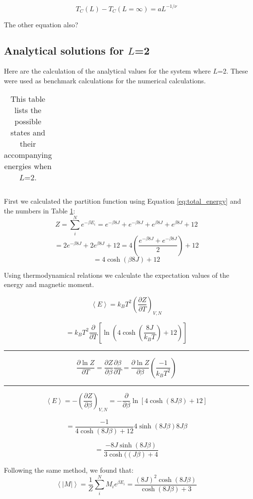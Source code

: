 \begin{equation}\label{eq:critical_T}
T_C(L) - T_C(L=\infty) = a L^{-1/\nu}
\end{equation}

The other equation also?

\subsection{Analytical solutions for $L$=2}\label{sec:analytical_sol}

Here are the calculation of the analytical values for the system where $L$=2. These were used as benchmark calculations for the numerical calculations.

\begin{table}[H]
	\caption{This table lists the possible states and their accompanying energies when $L$=2.}
	\label{tab:macro_energies}
\begin{tabular}{cccccc}
	
\end{tabular}
\end{table}

First we calculated the partition function using Equation \ref{eq:total_energy} and the numbers in Table \ref{tab:macro_energies}:
\[
Z = \sum_i^N e^{-\beta E_i} = e^{-\beta 8 J} + e^{-\beta 8 J} + e^{\beta 8 J}+e^{\beta 8 J} + 12
\]
\[
= 2e^{-\beta 8 J}+ 2e^{\beta 8 J} + 12 = 4\left(\frac{e^{-\beta 8 J}+ e^{-\beta 8 J}}{2}\right)+12
\]
\[
= 4 \cosh\left( \beta 8 J \right) + 12
\]

Using thermodynamical relations we calculate the expectation values of the energy and magnetic moment\cite{Thermal}.

\[
\left< E \right> = k_B T^2 \left(\frac{\partial Z}{\partial T}
\right)_{V,N}
\]

\[
= k_B T^2 \frac{\partial}{\partial T} \left[\ln \left(4\cosh \left(\frac{8J}{k_BT}\right) +12\right) \right]\]
\hrule
\[
\frac{\partial \ln Z}{\partial T} = \frac{\partial Z}{\partial \beta}\frac{\partial \beta}{\partial T} = \frac{\partial \ln Z}{\partial \beta}\left(\frac{-1}{k_B T^2}\right)
\]
\hrule
\[
\left< E\right> = -\left(\frac{\partial Z}{\partial \beta} \right)_{V,N} = - \frac{\partial}{\partial \beta} \ln \left[ 4 \cosh \left( 8J\beta\right)+12\right]
\]

\[
= \frac{-1}{4\cosh (8J\beta) + 12}4 \sinh(8J\beta)8J\beta
\]

\[
= \frac{-8J \sinh(8J\beta)}{3\cosh((J\beta)+ 4}
\]

Following the same method, we found that:
\[
\left< |M| \right> = \frac{1}{Z} \sum_i^N M_i e^{\beta E_i}  = \frac{(8J)^2 \cosh(8J\beta )}{\cosh (8J\beta ) + 3}
\]

